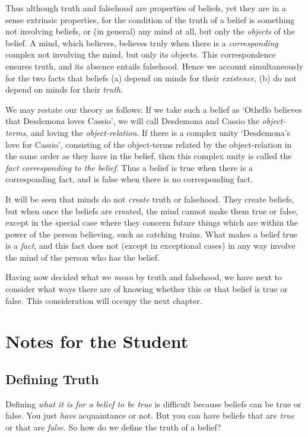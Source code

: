 \documentclass[oneside,letterpaper,12pt]{book}
\begin{document}
Thus although truth and falsehood are properties of beliefs, yet they
are in a sense extrinsic properties, for the condition of the truth of a
belief is something not involving beliefs, or (in general) any mind at
all, but only the \emph{objects} of the belief. A mind, which believes,
believes truly when there is a \emph{corresponding} complex not
involving the mind, but only its objects. This correspondence ensures
truth, and its absence entails falsehood. Hence we account
simultaneously for the two facts that beliefs (a) depend on minds for
their \emph{existence}, (b) do not depend on minds for their
\emph{truth}.

We may restate our theory as follows: If we take such a belief as
`Othello believes that Desdemona loves
Cassio', we will call Desdemona and Cassio the
\emph{object-terms}, and loving the \emph{object-relation}. If there is
a complex unity `Desdemona's love for
Cassio', consisting of the object-terms related by the
object-relation in the same order as they have in the belief, then this
complex unity is called the \emph{fact corresponding to the belief}.
Thus a belief is true when there is a corresponding fact, and is false
when there is no corresponding fact.

It will be seen that minds do not \emph{create} truth or falsehood. They
create beliefs, but when once the beliefs are created, the mind cannot
make them true or false, except in the special case where they concern
future things which are within the power of the person believing, such
as catching trains. What makes a belief true is a \emph{fact}, and this
fact does not (except in exceptional cases) in any way involve the mind
of the person who has the belief.

Having now decided what we \emph{mean} by truth and falsehood, we have
next to consider what ways there are of knowing whether this or that
belief is true or false. This consideration will occupy the next
chapter.

\protect\hypertarget{link2HCH0013}{}{}

\pagebreak
\section{Notes for the Student}
	\subsection*{Defining Truth}
Defining \textit{what it is for a belief to be true} is difficult because beliefs can be true or false. You just \textit{have} acquaintance or not. But you can have beliefs that are \textit{true} or that are \textit{false}. So how do we define the truth of a belief?
\end{document}
